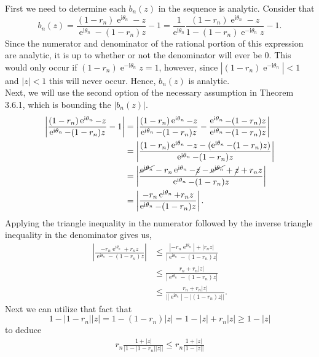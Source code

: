 \documentclass[10pt]{amsart}
\newcommand{\I}{\mathrm{i}}
\DeclareMathOperator{\E}{e}
\theoremstyle{nonumberplain}
\begin{document}
\begin{enumerate}[label={\bf {\arabic*}:}]
\begin{itemize}
\indent
First we need to determine each $b_n(z)$ in the sequence is analytic.
Consider that 
$$
b_n(z)
	= \frac{ (1 - r_n)\E^{\I \theta_n} - z}{ \E^{\I \theta_n} - (1 - r_n) z} - 1
	= \frac 1 {\E^{\I \theta_n}} \frac{ (1 - r_n) \E^{\I \theta_n} - z} {1 - (1 - r_n)\E^{-\I \theta_n} z} - 1.
$$
Since the numerator and denominator of the rational portion of this expression are analytic, it is up to whether or not the denominator will ever be 0.
This would only occur if $(1 - r_n)\E^{-\I \theta_n} z = 1$, however, since $|(1 - r_n)\E^{-\I \theta_n}| < 1$ and $|z| < 1$ this will never occur.
Hence, $b_n(z)$ is analytic. \\

\noindent
Next, we will use the second option of the necessary assumption in Theorem 3.6.1, which is bounding the $|b_n(z)|$.
\begin{align*}
\left|\frac{ (1 - r_n)\E^{\I \theta_n} - z}{ \E^{\I \theta_n} - (1 - r_n) z} - 1 \right| 
	&= \left|\frac{ (1 - r_n)\E^{\I \theta_n} - z}{ \E^{\I \theta_n} - (1 - r_n) z} - \frac{\E^{\I \theta_n} - (1 - r_n) z}{\E^{\I \theta_n} - (1 - r_n) z}\right| \\
	&= \left|\frac{ (1 - r_n)\E^{\I \theta_n} - z - (\E^{\I \theta_n} - (1 - r_n) z)}{ \E^{\I \theta_n} - (1 - r_n) z} \right| \\
	&= \left|\frac{ \cancel{\E^{\I \theta_n}} - r_n\E^{\I \theta_n} - \cancel{z} - \cancel{\E^{\I \theta_n}} + \cancel{z} + r_n z}{ \E^{\I \theta_n} - (1 - r_n) z} \right| \\
	&= \left|\frac{ - r_n\E^{\I \theta_n} + r_n z}{ \E^{\I \theta_n} - (1 - r_n) z} \right|.
\end{align*}
Applying the triangle inequality in the numerator followed by the inverse triangle inequality in the denominator gives us,
\begin{align*}
\left|\frac{ - r_n\E^{\I \theta_n} + r_n z}{ \E^{\I \theta_n} - (1 - r_n) z} \right|
	&\leq \frac{ |-r_n\E^{\I \theta_n}| + |r_n z|}{ \left|\E^{\I \theta_n} - (1 - r_n) z \right|} \\
	&\leq \frac{ r_n + r_n |z|}{ \left|\E^{\I \theta_n} - (1 - r_n) z \right|} \\
	&\leq \frac{ r_n + r_n |z|}{ \big| |\E^{\I \theta_n}| - |(1 - r_n) z| \big|}.
\end{align*}
Next we can utilize that fact that
$$1 - |1 -  r_n| |z| = 1 - (1 - r_n) |z| = 1 - |z| + r_n|z| \geq 1 - |z|$$
to deduce
\begin{align*}
r_n \frac{1 + |z|}{ \big| 1 - |1 - r_n| |z| \big|}
	\leq r_n \frac{1 + |z|}{ \big| 1 - |z| \big|} 

\end{align*}
\end{itemize}
\end{enumerate}
\end{document}
